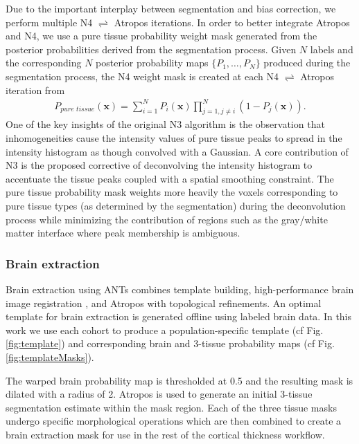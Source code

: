 Due to the important interplay between segmentation and bias correction,
we perform multiple N4 $\rightleftharpoons$ Atropos iterations.
In order to better integrate Atropos and N4, we use  
a pure tissue probability weight mask generated from the 
posterior probabilities derived from the segmentation 
process.  Given $N$ labels and the corresponding $N$
posterior probability maps $\{ P_1, \ldots, P_N\}$ produced
during the segmentation process, the N4 weight mask is 
created at each N4 $\rightleftharpoons$ Atropos iteration from
\begin{align}
  P_{pure\,\,tissue}(\mathbf{x}) = \sum_{i=1}^N P_i(\mathbf{x}) \prod_{j=1, j \neq i}^N \left( 1 - P_j(\mathbf{x}) \right).
\end{align}
One of the key insights of the original N3 algorithm is the
observation that inhomogeneities cause the intensity values of
pure tissue peaks to spread in the intensity histogram as though
convolved with a Gaussian.  A core contribution of N3 is the
proposed corrective of deconvolving the intensity histogram to 
accentuate the tissue peaks coupled with a spatial smoothing 
constraint. The pure tissue probability mask
weights more heavily the voxels corresponding to pure tissue 
types (as determined by the segmentation) during the deconvolution process 
while minimizing the contribution of regions such as the gray/white matter 
interface where peak membership is ambiguous. 

\subsubsection{Brain extraction}

Brain extraction using ANTs combines template building, high-performance
brain image registration \citep{avants2011}, and Atropos with topological refinements.  
An optimal template for brain extraction is 
generated offline using labeled brain data.  
In this work we use each cohort to produce a population-specific template 
(cf Fig. \ref{fig:template}) and corresponding brain and 3-tissue probability
maps (cf Fig. \ref{fig:templateMasks}). 

  The warped brain probability map is thresholded at 0.5 and the resulting mask is dilated
with a radius of 2.  Atropos is used to generate an initial 3-tissue segmentation estimate within the mask
region.  Each of the three tissue masks undergo specific morphological operations which are then
combined to create a brain extraction mask for use in the rest of the
cortical thickness workflow.  

